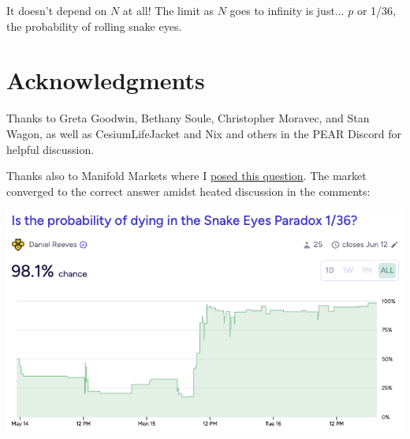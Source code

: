 \documentclass[article,twocolumn]{memoir}
\begin{document}
It doesn't depend on $N$ at all!
The limit as $N$ goes to infinity is just... 
$p$ or 1/36, the probability of rolling snake eyes.
\qedsymbol{}


\chapter*{Acknowledgments}

Thanks to 
Greta Goodwin, 
Bethany Soule, 
Christopher Moravec,
and Stan Wagon, as well as
CesiumLifeJacket and Nix and others in the PEAR Discord for helpful discussion.

Thanks also to Manifold Markets where I 
\href{https://manifold.markets/dreev/is-the-probability-of-dying-in-the}{posed this question}.
The market converged to the correct answer amidst heated discussion in the comments:

\vspace{2em}

\noindent
\includegraphics[width=\linewidth]{manifold-snakeeyes}

\end{document}
